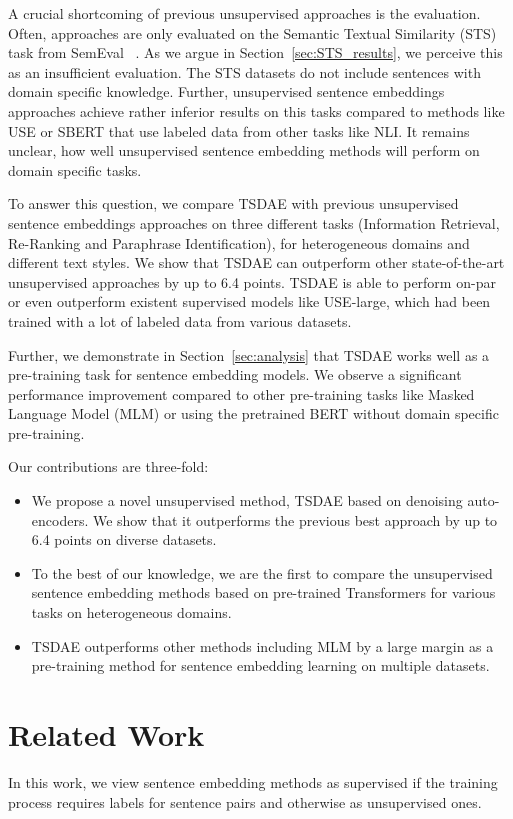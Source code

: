 \documentclass[11pt,a4paper]{article}
\begin{document}
A crucial shortcoming of previous unsupervised approaches is the evaluation. Often, approaches are only evaluated on the Semantic Textual Similarity (STS) task from SemEval ~\citep{DBLP:conf/emnlp/LiZHWYL20,carlsson2021semantic,DBLP:journals/corr/abs-2006-03659}. As we argue in Section~\ref{sec:STS_results}, we perceive this as an insufficient evaluation. The STS datasets do not include sentences with domain specific knowledge. Further, unsupervised sentence embeddings approaches achieve rather inferior results on this tasks compared to methods like USE or SBERT that use labeled data from other tasks like NLI. It remains unclear, how well unsupervised sentence embedding methods will perform on domain specific tasks.

To answer this question, we compare TSDAE with previous unsupervised sentence embeddings approaches on three different tasks (Information Retrieval, Re-Ranking and Paraphrase Identification), for heterogeneous domains and different text styles. We show that TSDAE can outperform other state-of-the-art unsupervised approaches by up to 6.4 points. TSDAE is able to perform on-par or even outperform existent supervised models like USE-large, which had been trained with a lot of labeled data from various datasets.

Further, we demonstrate in Section~\ref{sec:analysis} that TSDAE works well as a pre-training task for sentence embedding models. We observe a significant performance improvement compared to other pre-training tasks like Masked Language Model (MLM) or using the pretrained BERT without domain specific pre-training.


Our contributions are three-fold:
\begin{itemize}
    \item We propose a novel unsupervised method, TSDAE based on denoising auto-encoders. We show that it outperforms the previous best approach by up to 6.4 points on diverse datasets.
    \item To the best of our knowledge, we are the first to compare the unsupervised sentence embedding methods based on pre-trained Transformers for various tasks on heterogeneous domains.
    \item TSDAE outperforms other methods including MLM by a large margin as a pre-training method for sentence embedding learning on multiple datasets.
\end{itemize}

\section{Related Work}
In this work, we view sentence embedding methods as supervised if the training process requires labels for sentence pairs and otherwise as unsupervised ones.
\end{document}
